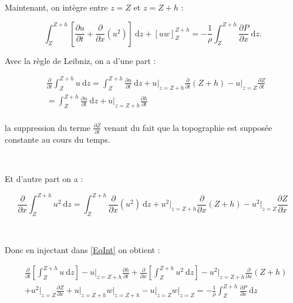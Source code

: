 \documentclass[
11pt, %
francais, %
singlespacing, %
headsepline, %
]{MastersDoctoralThesis} %
\begin{document}
Maintenant, on intègre entre $z=Z$ et $z=Z+h$ :

\begin{equation}
\int_{Z}^{Z+h}\left[\frac{\partial u}{\partial t}+\frac{\partial }{\partial x}(u^{2})\right]~\mathrm dz+\left[uw\right]_{Z}^{Z+h}=-\frac{1}{\rho}\int_{Z}^{Z+h}\frac{\partial P}{\partial x}~\mathrm dz. \label{EqInt}
\end{equation}

Avec la règle de Leibniz, on a d'une part :

\begin{equation}
\begin{split}
& \frac{\partial}{\partial t}\int_{Z}^{Z+h}u ~\mathrm dz = \int_{Z}^{Z+h}\frac{\partial u}{\partial t} ~\mathrm dz +u\vert_{z=Z+h}\frac{\partial}{\partial t}(Z+h)-u\vert_{z=Z}\frac{\partial Z}{\partial t} \\
& = \int_{Z}^{Z+h}\frac{\partial u}{\partial t} ~\mathrm dz +u\vert_{z=Z+h}\frac{\partial h}{\partial t} \\
\end{split}
\end{equation}

la suppression du terme $\frac{\partial Z}{\partial t}$ venant du fait que la topographie est supposée constante au cours du temps.

\

Et d'autre part on a :

\begin{equation}
\frac{\partial}{\partial x}\int_{Z}^{Z+h}u^{2} ~\mathrm dz = \int_{Z}^{Z+h}\frac{\partial }{\partial x}(u^{2}) ~\mathrm dz +u^{2}\vert_{z=Z+h}\frac{\partial}{\partial x}(Z+h)-u^{2}\vert_{z=Z}\frac{\partial Z}{\partial x} 
\end{equation}

\

Donc en injectant dans \eqref{EqInt} on obtient :

\begin{equation}
\begin{split}
& \frac{\partial}{\partial t}\left[\int_{Z}^{Z+h}u ~\mathrm dz\right] -u\vert_{z=Z+h}\frac{\partial h}{\partial t} + \frac{\partial}{\partial x}\left[\int_{Z}^{Z+h} u^{2} ~\mathrm dz\right]-u^{2}\vert_{z=Z+h}\frac{\partial}{\partial x}(Z+h) \\
& +u^{2}\vert_{z=Z}\frac{\partial Z}{\partial x}+u\vert_{z=Z+h}w\vert_{z=Z+h}-u\vert_{z=Z}w\vert_{z=Z}= -\frac{1}{\rho}\int_{Z}^{Z+h}\frac{\partial P}{\partial x} ~\mathrm dz \\
\end{split}
\end{equation}
\end{document}
